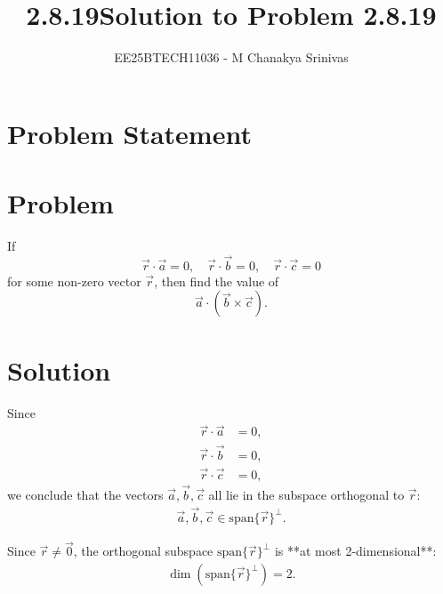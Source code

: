 \documentclass[journal]{IEEEtran}
\begin{document}

\vspace{3cm}

\title{2.8.19}
\author{EE25BTECH11036 - M Chanakya Srinivas}
\maketitle

\renewcommand{\thetable}{\theenumi}
\setlength{\intextsep}{10pt}
\renewcommand\theequation{\arabic{equation}}


\title{Solution to Problem 2.8.19}
\author{}
\date{}
\maketitle

\section*{Problem Statement}
\section*{Problem}
If 
\[
\vec{r} \cdot \vec{a} = 0, \quad 
\vec{r} \cdot \vec{b} = 0, \quad 
\vec{r} \cdot \vec{c} = 0
\]
for some non-zero vector $\vec{r}$, then find the value of 
\[
\vec{a} \cdot (\vec{b} \times \vec{c}).
\]

\section*{Solution}

Since
\begin{align}
\vec{r} \cdot \vec{a} &= 0, \label{eq:1} \\
\vec{r} \cdot \vec{b} &= 0, \label{eq:2} \\
\vec{r} \cdot \vec{c} &= 0, \label{eq:3}
\end{align}
we conclude that the vectors $\vec{a}, \vec{b}, \vec{c}$ all lie in the subspace orthogonal to $\vec{r}$:
\begin{align}
\vec{a}, \vec{b}, \vec{c} \in \text{span}\{\vec{r}\}^{\perp}. \label{eq:4}
\end{align}

Since $\vec{r} \neq \vec{0}$, the orthogonal subspace $\text{span}\{\vec{r}\}^{\perp}$ is **at most 2-dimensional**:
\begin{align}
\dim(\text{span}\{\vec{r}\}^{\perp}) = 2. \label{eq:5}
\end{align}
\end{document}

